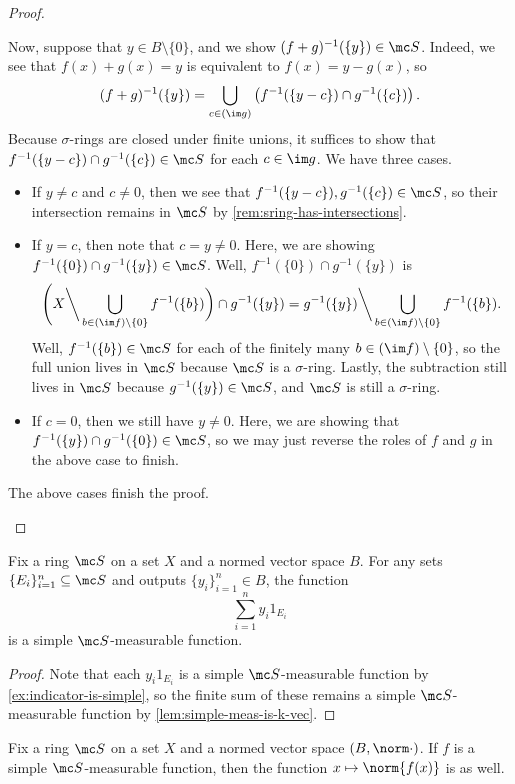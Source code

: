 \documentclass[../notes.tex]{subfiles}
\begin{document}
\begin{proof}
\begin{itemize}
		Now, suppose that $y\in B\setminus\{0\}$, and we show $(f+g)^{-1}(\{y\})\in\mc S$. Indeed, we see that $f(x)+g(x)=y$ is equivalent to $f(x)=y-g(x)$, so
		\[(f+g)^{-1}(\{y\})=\bigcup_{c\in(\im g)}\left(f^{-1}(\{y-c\})\cap g^{-1}(\{c\})\right).\]
		Because $\sigma$-rings are closed under finite unions, it suffices to show that $f^{-1}(\{y-c\})\cap g^{-1}(\{c\})\in\mc S$ for each $c\in\im g$. We have three cases.
		\begin{itemize}
			\item If $y\ne c$ and $c\ne0$, then we see that $f^{-1}(\{y-c\}),g^{-1}(\{c\})\in\mc S$, so their intersection remains in $\mc S$ by \autoref{rem:sring-has-intersections}.
			\item If $y=c$, then note that $c=y\ne0$. Here, we are showing $f^{-1}(\{0\})\cap g^{-1}(\{y\})\in\mc S$. Well, $f^{-1}(\{0\})\cap g^{-1}(\{y\})$ is
			\[\Bigg(X{\mathbin\bigg\backslash}\bigcup_{b\in(\im f)\setminus\{0\}}f^{-1}(\{b\})\bigg)\cap g^{-1}(\{y\})=g^{-1}(\{y\}){\mathbin\bigg\backslash}\bigcup_{b\in(\im f)\setminus\{0\}}f^{-1}(\{b\}).\]
			Well, $f^{-1}(\{b\})\in\mc S$ for each of the finitely many $b\in(\im f)\setminus\{0\}$, so the full union lives in $\mc S$ because $\mc S$ is a $\sigma$-ring. Lastly, the subtraction still lives in $\mc S$ because $g^{-1}(\{y\})\in\mc S$, and $\mc S$ is still a $\sigma$-ring.
			\item If $c=0$, then we still have $y\ne0$. Here, we are showing that $f^{-1}(\{y\})\cap g^{-1}(\{0\})\in\mc S$, so we may just reverse the roles of $f$ and $g$ in the above case to finish.
		\end{itemize}
		The above cases finish the proof.
		\qedhere
	\end{itemize}
\end{proof}
\begin{corollary} \label{cor:indicator-sum-is-simp-meas}
	Fix a ring $\mc S$ on a set $X$ and a normed vector space $B$. For any sets $\{E_i\}_{i=1}^n\subseteq\mc S$ and outputs $\{y_i\}_{i=1}^n\in B$, the function
	\[\sum_{i=1}^ny_i1_{E_i}\]
	is a simple $\mc S$-measurable function.
\end{corollary}
\begin{proof}
	Note that each $y_i1_{E_i}$ is a simple $\mc S$-measurable function by \autoref{ex:indicator-is-simple}, so the finite sum of these remains a simple $\mc S$-measurable function by \autoref{lem:simple-meas-is-k-vec}.
\end{proof}
\begin{lemma} \label{lem:norm-is-simple-meas}
	Fix a ring $\mc S$ on a set $X$ and a normed vector space $(B,\norm\cdot)$. If $f$ is a simple $\mc S$-measurable function, then the function $x\mapsto\norm{f(x)}$ is as well.
\end{lemma}
\end{document}
